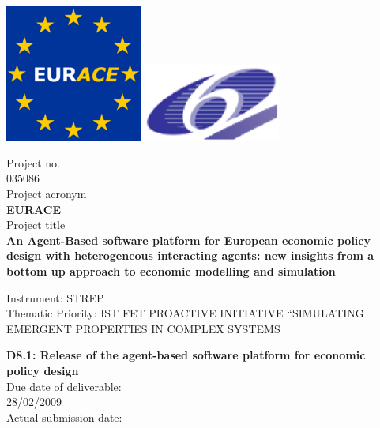 \documentclass[a4paper,11pt]{article}
\begin{document}
\thispagestyle{empty}

\vspace{\baselineskip}
\includegraphics[width=45mm]{EURACE-Flag.eps} \hfill
\includegraphics[width=45mm]{eu_6.eps}

\begin{center}
Project no.\\
035086\\
Project acronym\\
{\bf EURACE}\\
Project title\\
{\bf An Agent-Based software platform for European economic policy design with heterogeneous interacting agents: new insights from a bottom up approach to economic modelling and simulation}\\
\end{center}

\vspace*{\baselineskip}\noindent
Instrument: STREP\\[\baselineskip]
Thematic Priority: IST FET PROACTIVE INITIATIVE ``SIMULATING EMERGENT PROPERTIES IN COMPLEX SYSTEMS\\

\vspace*{2\baselineskip}
\begin{center}
{\bf
D8.1: Release of the agent-based software platform for economic\\
policy design\\ }
Due date of deliverable:\\
28/02/2009\\
Actual submission date:\\
\end{center}
\end{document}
